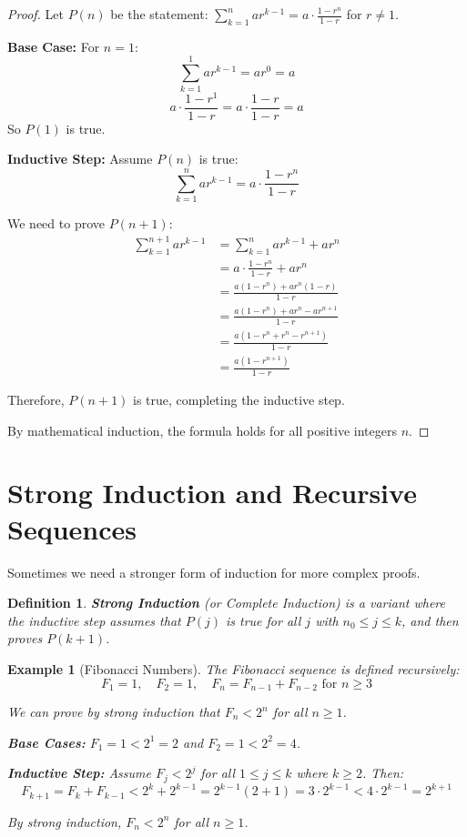 \documentclass[12pt]{article}
\newtheorem{definition}{Definition}
\newtheorem{example}{Example}
\begin{document}
\begin{proof}
Let $P(n)$ be the statement: $\sum_{k=1}^{n} ar^{k-1} = a \cdot \frac{1-r^n}{1-r}$ for $r \neq 1$.

\textbf{Base Case:} For $n = 1$:
$$\sum_{k=1}^{1} ar^{k-1} = ar^0 = a$$
$$a \cdot \frac{1-r^1}{1-r} = a \cdot \frac{1-r}{1-r} = a$$
So $P(1)$ is true.

\textbf{Inductive Step:} Assume $P(n)$ is true:
$$\sum_{k=1}^{n} ar^{k-1} = a \cdot \frac{1-r^n}{1-r}$$

We need to prove $P(n+1)$:
\begin{align}
\sum_{k=1}^{n+1} ar^{k-1} &= \sum_{k=1}^{n} ar^{k-1} + ar^n \\
&= a \cdot \frac{1-r^n}{1-r} + ar^n \\
&= \frac{a(1-r^n) + ar^n(1-r)}{1-r} \\
&= \frac{a(1-r^n) + ar^n - ar^{n+1}}{1-r} \\
&= \frac{a(1-r^n + r^n - r^{n+1})}{1-r} \\
&= \frac{a(1-r^{n+1})}{1-r}
\end{align}

Therefore, $P(n+1)$ is true, completing the inductive step.

By mathematical induction, the formula holds for all positive integers $n$.
\end{proof}

\section{Strong Induction and Recursive Sequences}

Sometimes we need a stronger form of induction for more complex proofs.

\begin{definition}
\textbf{Strong Induction} (or Complete Induction) is a variant where the inductive step assumes that $P(j)$ is true for all $j$ with $n_0 \leq j \leq k$, and then proves $P(k+1)$.
\end{definition}

\begin{example}[Fibonacci Numbers]
The Fibonacci sequence is defined recursively:
$$F_1 = 1, \quad F_2 = 1, \quad F_n = F_{n-1} + F_{n-2} \text{ for } n \geq 3$$

We can prove by strong induction that $F_n < 2^n$ for all $n \geq 1$.

\textbf{Base Cases:} $F_1 = 1 < 2^1 = 2$ and $F_2 = 1 < 2^2 = 4$.

\textbf{Inductive Step:} Assume $F_j < 2^j$ for all $1 \leq j \leq k$ where $k \geq 2$. Then:
$$F_{k+1} = F_k + F_{k-1} < 2^k + 2^{k-1} = 2^{k-1}(2 + 1) = 3 \cdot 2^{k-1} < 4 \cdot 2^{k-1} = 2^{k+1}$$

By strong induction, $F_n < 2^n$ for all $n \geq 1$.
\end{example}
\end{document}
